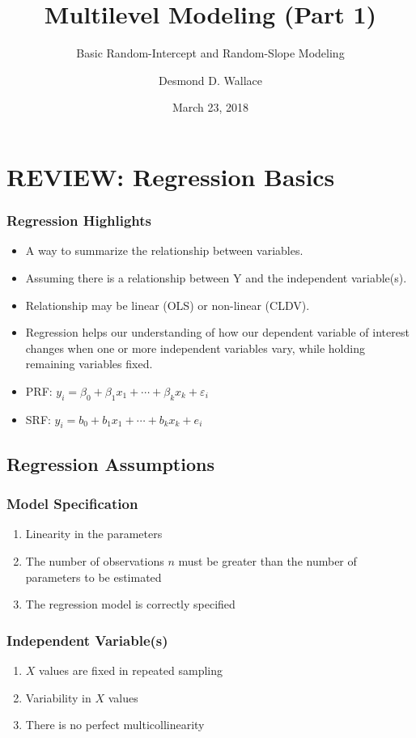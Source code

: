 \documentclass{beamer}
\title[MLM I]{Multilevel Modeling (Part 1)}
\subtitle[ISRC Workshop]{Basic Random-Intercept and Random-Slope Modeling}
\author[Wallace]{Desmond D. Wallace}
\institute[University of Iowa]{Department of Political Science\\The University of Iowa\\Iowa City, IA}
\date{March 23, 2018}
\begin{document}
\begin{frame}
	\titlepage
\end{frame}


\section{REVIEW: Regression Basics}

\begin{frame}
	\frametitle{Regression Highlights}
	\begin{itemize}
		\item A way to summarize the relationship between variables.
		\item Assuming there is a relationship between Y and the independent variable(s).
		\item Relationship may be linear (OLS) or non-linear (CLDV).
		\item Regression helps our understanding of how our dependent variable of interest changes when one or more independent variables vary, while holding remaining variables fixed.
		\item PRF: $y_{i}=\beta_{0}+\beta_{1}x_{1}+\cdots+\beta_{k}x_{k}+\varepsilon_{i}$
		\item SRF: $y_{i}=b_{0}+b_{1}x_{1}+\cdots+b_{k}x_{k}+e_{i}$
	\end{itemize}
\end{frame}

\subsection{Regression Assumptions}

\begin{frame}
	\frametitle{Model Specification}
		\begin{enumerate}
			\item Linearity in the parameters
			\item The number of observations $n$ must be greater than the number of parameters to be estimated
			\item The regression model is correctly specified
		\end{enumerate}
\end{frame}

\begin{frame}
	\frametitle{Independent Variable(s)}
		\begin{enumerate}
			\item $X$ values are fixed in repeated sampling
			\item Variability in $X$ values
			\item There is no perfect multicollinearity
		\end{enumerate}
\end{frame}
\end{document}
